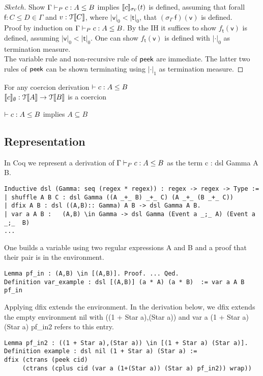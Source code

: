 \documentclass[a4paper,UKenglish,cleveref, autoref, thm-restate]{lipics-v2021}
\newcommand\mycomment[1]{}
\begin{document}
\begin{proof}[Sketch]
Show $\containsG{c}{A}{B}$ implies $\interp{c}_{\sigma_{\Gamma}}(\mathsf{t})$ is defined, assuming that forall $\mathsf{f} : C \leq D \in \Gamma$ and $\mathsf{v} : \type{C}$, where $|\mathsf{v}|_0 < |\mathsf{t}|_0$, that $(\sigma_{\Gamma}~\mathsf{f})(\mathsf{v})$ is defined.\\
Proof by induction on $\containsG{c}{A}{B}$. By the IH it suffices to show $f_{\mathsf{t}}(\mathsf{v})$ is defined, assuming $|\mathsf{v}|_0 < |\mathsf{t}|_0$. One can show $f_{\mathsf{t}}(\mathsf{v})$ is defined with $|\cdot|_0$ as termination measure.\\
The variable rule and non-recursive rule of $\textsf{peek}$ are immediate. The latter two rules of $\textsf{peek}$ can be shown terminating using $|\cdot|_1$ as termination measure.
\end{proof}
\begin{lemma}
 For any coercion derivation $\contains{}{c}{A}{B}$\\ 
$\llbracket c \rrbracket_\emptyset :\mathcal{T}\llbracket A \rrbracket \rightarrow \mathcal{T}\llbracket B \rrbracket$ is a coercion
\end{lemma}
\begin{corollary}[Soundness]
$\contains{}{c}{A}{B}$ implies $A \subseteq B$
\end{corollary}
\subsection{Representation}
In Coq we represent a derivation of $\containsG{c}{A}{B}$ as the term  \textsf{c : dsl Gamma A B}.
\mycomment{change drop to peek in code}
\begin{verbatim}
Inductive dsl (Gamma: seq (regex * regex)) : regex -> regex -> Type := 
| shuffle A B C : dsl Gamma ((A _+_ B) _+_ C) (A _+_ (B _+_ C))
| dfix A B : dsl ((A,B):: Gamma) A B -> dsl Gamma A B.
| var a A B :   (A,B) \in Gamma -> dsl Gamma (Event a _;_ A) (Event a _;_  B) 
...
\end{verbatim}
One builds a variable using two regular expressions \textsf{A} and \textsf{B} and a proof that their pair is in the environment. 
\begin{verbatim}
Lemma pf_in : (A,B) \in [(A,B)]. Proof. ... Qed.
Definition var_example : dsl [(A,B)] (a * A) (a * B)  := var a A B pf_in
\end{verbatim}
Applying \textsf{dfix} extends the environment. In the derivation below, we \textsf{dfix} extends the empty environment \textsf{nil} with \textsf{((1 + Star a),(Star a))} and \textsf{var a (1 + Star a) (Star a) pf\_in2} refers to this entry.
\begin{verbatim}
Lemma pf_in2 : ((1 + Star a),(Star a)) \in [(1 + Star a) (Star a)].
Definition example : dsl nil (1 + Star a) (Star a) := 
dfix (ctrans (peek cid)
     (ctrans (cplus cid (var a (1+(Star a)) (Star a) pf_in2)) wrap))
\end{verbatim}
\end{document}
